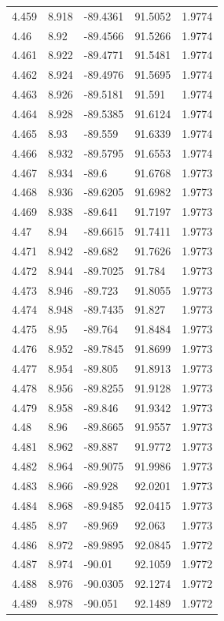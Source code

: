 \begin{tabular}{lllll}
4.459 & 8.918 & -89.4361 & 91.5052 & 1.9774 \\
4.46 & 8.92 & -89.4566 & 91.5266 & 1.9774 \\
4.461 & 8.922 & -89.4771 & 91.5481 & 1.9774 \\
4.462 & 8.924 & -89.4976 & 91.5695 & 1.9774 \\
4.463 & 8.926 & -89.5181 & 91.591 & 1.9774 \\
4.464 & 8.928 & -89.5385 & 91.6124 & 1.9774 \\
4.465 & 8.93 & -89.559 & 91.6339 & 1.9774 \\
4.466 & 8.932 & -89.5795 & 91.6553 & 1.9774 \\
4.467 & 8.934 & -89.6 & 91.6768 & 1.9773 \\
4.468 & 8.936 & -89.6205 & 91.6982 & 1.9773 \\
4.469 & 8.938 & -89.641 & 91.7197 & 1.9773 \\
4.47 & 8.94 & -89.6615 & 91.7411 & 1.9773 \\
4.471 & 8.942 & -89.682 & 91.7626 & 1.9773 \\
4.472 & 8.944 & -89.7025 & 91.784 & 1.9773 \\
4.473 & 8.946 & -89.723 & 91.8055 & 1.9773 \\
4.474 & 8.948 & -89.7435 & 91.827 & 1.9773 \\
4.475 & 8.95 & -89.764 & 91.8484 & 1.9773 \\
4.476 & 8.952 & -89.7845 & 91.8699 & 1.9773 \\
4.477 & 8.954 & -89.805 & 91.8913 & 1.9773 \\
4.478 & 8.956 & -89.8255 & 91.9128 & 1.9773 \\
4.479 & 8.958 & -89.846 & 91.9342 & 1.9773 \\
4.48 & 8.96 & -89.8665 & 91.9557 & 1.9773 \\
4.481 & 8.962 & -89.887 & 91.9772 & 1.9773 \\
4.482 & 8.964 & -89.9075 & 91.9986 & 1.9773 \\
4.483 & 8.966 & -89.928 & 92.0201 & 1.9773 \\
4.484 & 8.968 & -89.9485 & 92.0415 & 1.9773 \\
4.485 & 8.97 & -89.969 & 92.063 & 1.9773 \\
4.486 & 8.972 & -89.9895 & 92.0845 & 1.9772 \\
4.487 & 8.974 & -90.01 & 92.1059 & 1.9772 \\
4.488 & 8.976 & -90.0305 & 92.1274 & 1.9772 \\
4.489 & 8.978 & -90.051 & 92.1489 & 1.9772 \\

\end{tabular}

